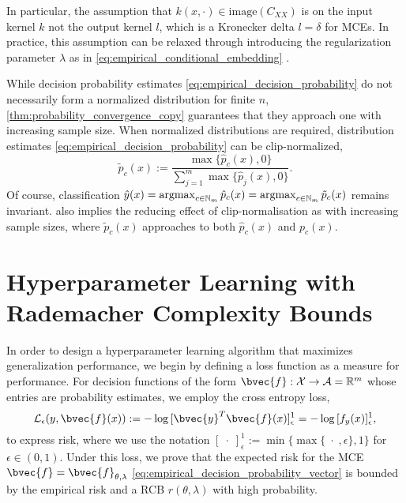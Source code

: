 \documentclass[twoside]{article}
\newcommand{\argmax}{\operatornamewithlimits{argmax}}
\begin{document}
		In particular, the assumption that $k(x, \cdot) \in \mathrm{image}(C_{XX})$ is on the input kernel $k$ not the output kernel $l$, which is a Kronecker delta $l = \delta$ for \glspl{MCE}. In practice, this assumption can be relaxed through introducing the regularization parameter $\lambda$ as in \eqref{eq:empirical_conditional_embedding} \citep{song2009hilbert}.
		
		While decision probability estimates \eqref{eq:empirical_decision_probability} do not necessarily form a normalized distribution for finite $n$, \cref{thm:probability_convergence_copy} guarantees that they approach one with increasing sample size. When normalized distributions are required, distribution estimates \eqref{eq:empirical_decision_probability} can be clip-normalized,
		\begin{equation}
		\tilde{p}_{c}(x) := \frac{\max\{\hat{p}_{c}(x), 0\}}{\sum_{j = 1}^{m} \max\{\hat{p}_{j}(x), 0\}}.
		\label{eq:empirical_decision_probability_clip_normalised}
		\end{equation}
		Of course, classification $\hat{y}(x) = \argmax_{c \in \mathbb{N}_{m}} \hat{p}_{c}(x) = \argmax_{c \in \mathbb{N}_{m}} \tilde{p}_{c}(x)$ remains invariant.   also implies the reducing effect of clip-normalisation as with increasing sample sizes, where $\tilde{p}_{c}(x)$ approaches to both $\hat{p}_{c}(x)$ and $p_{c}(x)$.
	
	\section{Hyperparameter Learning with Rademacher Complexity Bounds}
	\label{sec:hyperparameter_learning}
		
		In order to design a hyperparameter learning algorithm that maximizes generalization performance, we begin by defining a loss function as a measure for performance. For decision functions of the form $\bvec{f} : \mathcal{X} \to \mathcal{A} = \mathbb{R}^{m}$ whose entries are probability estimates, we employ the cross entropy loss,
		\begin{equation}
		\mathcal{L}_{\epsilon}(y, \bvec{f}(x)) := - \log{ [\bvec{y}^{T} \bvec{f}(x)]_{\epsilon}^{1} } = - \log{ [f_{y}(x)]_{\epsilon}^{1} },
		\label{eq:cross_entropy_loss_copy}
		\end{equation}
		to express risk, where we use the notation $[\;\cdot\;]_{\epsilon}^{1} := \min\{\max\{\;\cdot\;, \epsilon\}, 1\}$ for $\epsilon \in (0, 1)$. Under this loss, we prove that the expected risk for the \gls{MCE} $\bvec{f} = \bvec{f}_{\theta, \lambda}$ \eqref{eq:empirical_decision_probability_vector} is bounded by the empirical risk and a \gls{RCB} $r(\theta, \lambda)$ with high probability.
		
\end{document}
